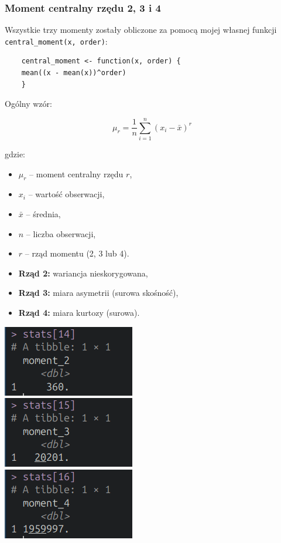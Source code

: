 \documentclass[polish]{article}
\begin{document}
    \newpage

    \subsubsection{Moment centralny rzędu 2, 3 i 4}

    Wszystkie trzy momenty zostały obliczone za pomocą mojej własnej funkcji \texttt{central\_moment(x, order)}:

    \begin{verbatim}
    central_moment <- function(x, order) {
    mean((x - mean(x))^order)
    }
    \end{verbatim}

    Ogólny wzór:

    \Large
    \[
    \mu_r = \frac{1}{n} \sum_{i=1}^{n} (x_i - \bar{x})^r
    \]
    \normalsize

    \noindent gdzie:
    \begin{itemize}
    \item \( \mu_r \) -- moment centralny rzędu \( r \),
    \item \( x_i \) -- wartość obserwacji,
    \item \( \bar{x} \) -- średnia,
    \item \( n \) -- liczba obserwacji,
    \item \( r \) -- rząd momentu (2, 3 lub 4).
    \end{itemize}

    \begin{itemize}
        \item \textbf{Rząd 2:} wariancja nieskorygowana,
        \item \textbf{Rząd 3:} miara asymetrii (surowa skośność),
        \item \textbf{Rząd 4:} miara kurtozy (surowa).
    \end{itemize}

    \begin{center}
        \includegraphics{img/moment2.png} \\
        \includegraphics{img/moment3.png} \\
        \includegraphics{img/moment4.png}
    \end{center}
\end{document}
